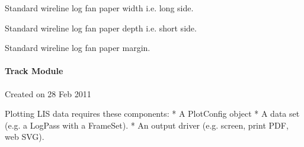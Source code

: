\documentclass[letterpaper,10pt,english]{sphinxmanual}
\begin{document}

\begin{fulllineitems}
\label{\detokenize{ref/util/plot/PlotConstants:TotalDepth.util.plot.PlotConstants.STANDARD_PAPER_WIDTH}}
Standard wireline log fan paper width i.e. long side.

\end{fulllineitems}


\begin{fulllineitems}
\label{\detokenize{ref/util/plot/PlotConstants:TotalDepth.util.plot.PlotConstants.STANDARD_PAPER_DEPTH}}
Standard wireline log fan paper depth i.e. short side.

\end{fulllineitems}


\begin{fulllineitems}
\label{\detokenize{ref/util/plot/PlotConstants:TotalDepth.util.plot.PlotConstants.STANDARD_PAPER_MARGIN}}
Standard wireline log fan paper margin.

\end{fulllineitems}



\paragraph{Track Module}
\label{\detokenize{ref/util/plot/Track:track-module}}\label{\detokenize{ref/util/plot/Track::doc}}\label{\detokenize{ref/util/plot/Track:module-TotalDepth.util.plot.Track}}
Created on 28 Feb 2011

Plotting LIS data requires these components:
* A PlotConfig object
* A data set (e.g. a LogPass with a FrameSet).
* An output driver (e.g. screen, print PDF, web SVG).
\end{document}
